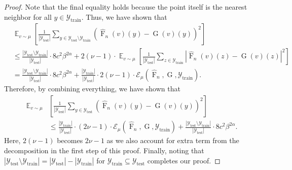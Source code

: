 \documentclass[11pt]{article}
\theoremstyle{plain}
\newcommand{\Ycal}{\mathcal{Y}}
\DeclareMathOperator*{\expect}{\mathbb{E}}
\begin{document}
\begin{proof}
Note that the final equality holds because the point itself is the nearest neighbor for all $y \in \Ycal_{\mathrm{train}}$.  Thus, we have shown that 
\begin{equation*}
\begin{split}
&\expect_{v \sim \mu} \left[ \frac{1}{|\mathcal{Y}_{\mathrm{test}}|} \sum_{y \in \mathcal{Y}_{\mathrm{test}} \setminus \mathcal{Y}_{\mathrm{train}}} \left( \widehat{\operatorname{F}}_n(v)(y) - \operatorname{G}(v)(y) \right)^2 \right] \\
&\leq  \frac{|\Ycal_{\mathrm{test}} \setminus \Ycal_{\mathrm{train}}|}{|\Ycal_{\mathrm{test}}|}\cdot 8c^2 \beta^{2\alpha}  + 2(\nu-1) \cdot \expect_{v \sim \mu} \left[ \frac{1}{|\mathcal{Y}_{\mathrm{test}}|} \sum_{z \in \Ycal_{\mathrm{train}}} \left| \widehat{\operatorname{F}}_n(v)(z) - \operatorname{G}(v)(z) \right|^2 \right]\\
&= \frac{|\Ycal_{\mathrm{test}} \setminus \Ycal_{\mathrm{train}}|}{|\Ycal_{\mathrm{test}}|}\cdot 8c^2 \beta^{2\alpha}  + \frac{|\mathcal{Y}_{\mathrm{train}}| }{|\Ycal_{\mathrm{test}}|} \cdot 2(\nu-1) \cdot \mathcal{E}_{\mu}(\widehat{\operatorname{F}}_n, \operatorname{G}, \Ycal_{\mathrm{train}}).
\end{split}
\end{equation*}
Therefore, by combining everything, we have shown that
\begin{equation*}
    \begin{split}
       \mathbb{E}_{v \sim \mu} &\left[ \frac{1}{|\mathcal{Y}_{\mathrm{test}}|} \sum_{y \in \mathcal{Y}_{\mathrm{test}}} \left( \widehat{\operatorname{F}}_n(v)(y) - \operatorname{G}(v)(y) \right)^2 \right] \\
       &\leq \frac{|\mathcal{Y}_{\mathrm{train}}| }{|\Ycal_{\mathrm{test}}|} \cdot (2\nu-1) \cdot \mathcal{E}_{\mu}(\widehat{\operatorname{F}}_n, \operatorname{G}, \Ycal_{\mathrm{train}})  + \frac{|\Ycal_{\mathrm{test}} \setminus \Ycal_{\mathrm{train}}|}{|\Ycal_{\mathrm{test}}|}\cdot 8c^2 \beta^{2\alpha}.
    \end{split}
\end{equation*}
Here, $2(\nu-1)$ becomes $2\nu-1$ as we also account for extra term from the decomposition in the first step of this proof. Finally, noting that $|\Ycal_{\mathrm{test}} \setminus \Ycal_{\mathrm{train}}|= |\Ycal_{\mathrm{test}}| - |\Ycal_{\mathrm{train}}|$ for $\Ycal_{\mathrm{train}} \subseteq \Ycal_{\mathrm{test}}$ completes our proof.




\end{proof}
\end{document}
